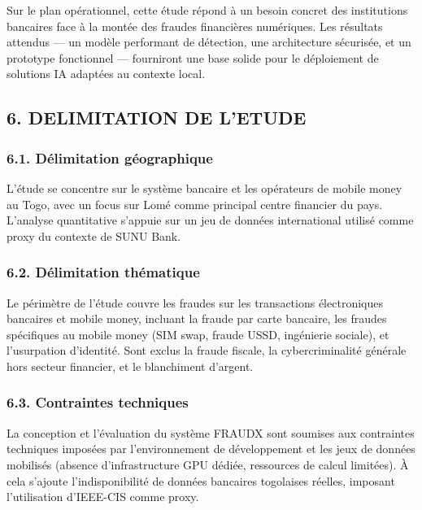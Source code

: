 \documentclass[
  12pt,
]{article}
\begin{document}
Sur le plan opérationnel, cette étude répond à un besoin concret des
institutions bancaires face à la montée des fraudes financières
numériques. Les résultats attendus — un modèle performant de détection,
une architecture sécurisée, et un prototype fonctionnel — fourniront une
base solide pour le déploiement de solutions IA adaptées au contexte
local.

\subsection{6. DELIMITATION DE L’ETUDE}\label{delimitation-de-letude}

\subsubsection{6.1. Délimitation
géographique}\label{duxe9limitation-guxe9ographique}

L’étude se concentre sur le système bancaire et les opérateurs de mobile
money au Togo, avec un focus sur Lomé comme principal centre financier
du pays. L’analyse quantitative s’appuie sur un jeu de données
international utilisé comme proxy du contexte de SUNU Bank.

\subsubsection{6.2. Délimitation
thématique}\label{duxe9limitation-thuxe9matique}

Le périmètre de l’étude couvre les fraudes sur les transactions
électroniques bancaires et mobile money, incluant la fraude par carte
bancaire, les fraudes spécifiques au mobile money (SIM swap, fraude
USSD, ingénierie sociale), et l’usurpation d’identité. Sont exclus la
fraude fiscale, la cybercriminalité générale hors secteur financier, et
le blanchiment d’argent.

\subsubsection{6.3. Contraintes
techniques}\label{contraintes-techniques}

La conception et l’évaluation du système FRAUDX sont soumises aux
contraintes techniques imposées par l’environnement de développement et
les jeux de données mobilisés (absence d’infrastructure GPU dédiée,
ressources de calcul limitées). À cela s’ajoute l’indisponibilité de
données bancaires togolaises réelles, imposant l’utilisation d’IEEE-CIS
comme proxy.
\end{document}
